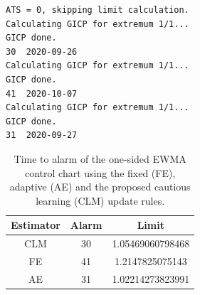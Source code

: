\documentclass[12pt,a4paper]{article}
\begin{document}
\begin{lstlisting}
ATS = 0, skipping limit calculation.
Calculating GICP for extremum 1/1...
GICP done.
30	2020-09-26
Calculating GICP for extremum 1/1...
GICP done.
41	2020-10-07
Calculating GICP for extremum 1/1...
GICP done.
31	2020-09-27
\end{lstlisting}

\begin{table}

\caption{\label{tab:ICU OC alarm}Time to alarm of the one-sided EWMA control chart using the fixed (FE), adaptive (AE) and the proposed cautious learning (CLM) update rules.}
\centering
\begin{tabular}[t]{c|c|c}
\hline
Estimator & Alarm & Limit\\
\hline
CLM & 30 & 1.05469060798468\\
FE & 41 & 1.2147825075143\\
AE & 31 & 1.02214273823991\\
\hline
\end{tabular}
\end{table}
\end{document}
